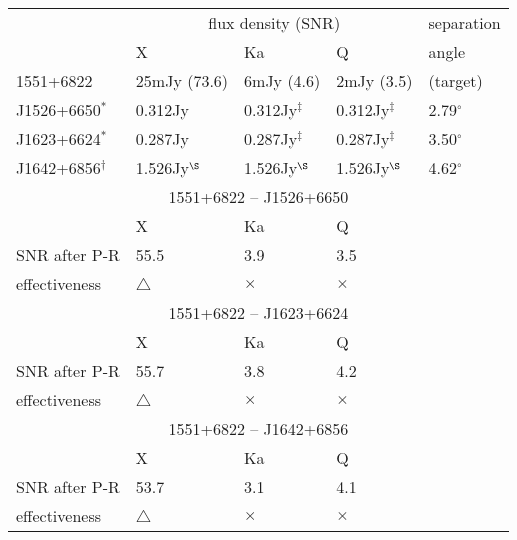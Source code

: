 \begin{tabular}{p{30mm}|p{30mm}|p{30mm}|p{30mm}|p{20mm}}
\hline
                 & \multicolumn{3}{c|}{flux density (SNR)}
                 & separation \\
\cline{2-4}
                 & X
                 & Ka
                 & Q
                 & angle \\
\hline
1551+6822        &  25mJy (73.6)
                 &   6mJy (4.6)
                 &   2mJy (3.5)
                 & (target)   \\
\hline
J1526+6650$^*$   & 0.312Jy
                 & 0.312Jy$^\ddag$
                 & 0.312Jy$^\ddag$
                 & 2.79$^\circ$ \\
\hline
J1623+6624$^*$   & 0.287Jy
                 & 0.287Jy$^\ddag$
                 & 0.287Jy$^\ddag$
                 & 3.50$^\circ$ \\
\hline
J1642+6856$^\dag$& 1.526Jy$^\S$
                 & 1.526Jy$^\S$
                 & 1.526Jy$^\S$
                 & 4.62$^\circ$ \\
\hline
\hline
\multicolumn{5}{c}{1551+6822 -- J1526+6650}         \\
\hline
              &  X          & Ka         & \multicolumn{2}{l}{Q}       \\
\hline
SNR after P-R & 55.5        &  3.9       & \multicolumn{2}{l}{3.5}     \\
\hline
effectiveness & $\triangle$ & $\times$   & \multicolumn{2}{l}{$\times$}\\
\hline
\hline
\multicolumn{5}{c}{1551+6822 -- J1623+6624}         \\
\hline
              &  X          & Ka         & \multicolumn{2}{l}{Q}       \\
\hline
SNR after P-R & 55.7        & 3.8        & \multicolumn{2}{l}{4.2}     \\
\hline
effectiveness & $\triangle$ & $\times$   & \multicolumn{2}{l}{$\times$}\\
\hline
\hline
\multicolumn{5}{c}{1551+6822 -- J1642+6856}         \\
\hline
              &  X          & Ka         & \multicolumn{2}{l}{Q}       \\
\hline
SNR after P-R & 53.7        & 3.1        & \multicolumn{2}{l}{4.1}     \\
\hline
effectiveness & $\triangle$ & $\times$   & \multicolumn{2}{l}{$\times$}\\
\hline
\end{tabular}

